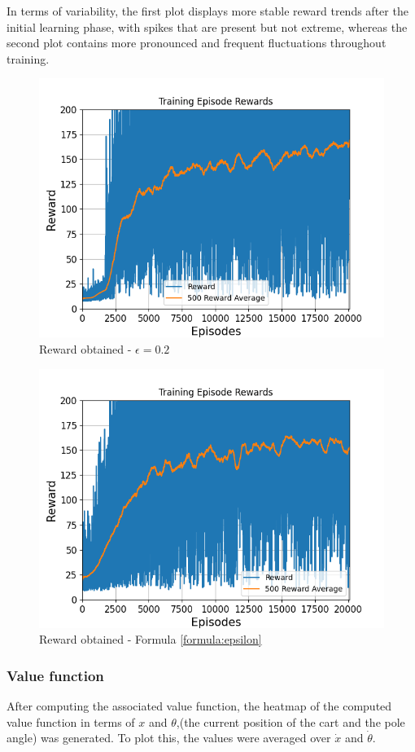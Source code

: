 \documentclass{article}
\begin{document}
In terms of variability, the first plot displays more stable reward trends after the initial learning phase, with spikes that are present but not extreme, whereas the second plot contains more pronounced and frequent fluctuations throughout training.


\begin{figure}[h]
	\centering
	\includegraphics[width=0.5\linewidth]{../data/plot/q_learning_constant_0.2.png}
	\caption{Reward obtained - $\epsilon = 0.2$}
	\label{fig:costant_eps}
\end{figure}

\begin{figure}[h]
	\centering
	\includegraphics[width=0.5\linewidth]{../data/plot/q_learning_GLIE.png}
	\caption{Reward obtained - Formula \ref{formula:epsilon}}
	\label{fig:glie_eps}
\end{figure}

\subsubsection{Value function}
After computing the associated value function, the heatmap of the computed value function in terms of $ x $ and $\theta$,(the current position of the cart and the pole angle) was generated. To plot this, the values were averaged over $\dot{x} $ and $\dot{\theta} $.
\end{document}
